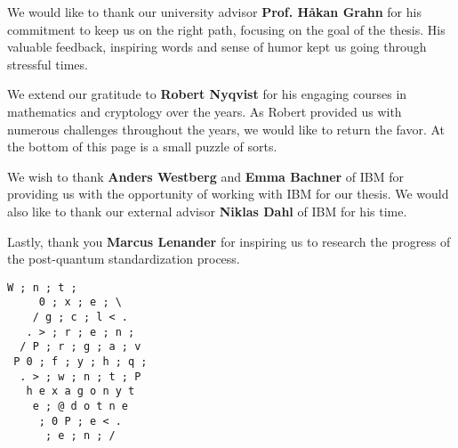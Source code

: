 \acknowledgments

\noindent We would like to thank our university advisor \textbf{Prof. Håkan Grahn} for his commitment to keep us on the right path, focusing on the goal of the thesis. His valuable feedback, inspiring words and sense of humor kept us going through stressful times.
\hfill\par\hfill\par
\noindent We extend our gratitude to \textbf{Robert Nyqvist} for his engaging courses in mathematics and cryptology over the years. As Robert provided us with numerous challenges throughout the years, we would like to return the favor. At the bottom of this page is a small puzzle of sorts.
\hfill\par\hfill\par
\noindent We wish to thank \textbf{Anders Westberg} and \textbf{Emma Bachner} of IBM for providing us with the opportunity of working with IBM for our thesis. We would also like to thank our external advisor \textbf{Niklas Dahl} of IBM for his time.
\hfill\par\hfill\par
\noindent Lastly, thank you \textbf{Marcus Lenander} for inspiring us to research the progress of the \gls{post-quantum} standardization process.

\vfill
\begin{center}
\begin{minipage}{4.5cm}
\linespread{0.8}
\begin{Verbatim}[fontsize=\small]
      W ; n ; t ;
     0 ; x ; e ; \
    / g ; c ; l < .
   . > ; r ; e ; n ;
  / P ; r ; g ; a ; v
 P 0 ; f ; y ; h ; q ;
  . > ; w ; n ; t ; P
   h e x a g o n y t
    e ; @ d o t n e
     ; 0 P ; e < .
      ; e ; n ; /
\end{Verbatim}
\end{minipage}
\end{center}

\cleardoublepage